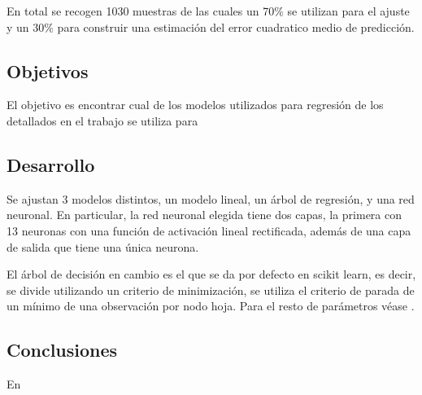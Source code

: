 \noindent 

\noindent En total se recogen 1030 muestras de las cuales un 70\% se utilizan para el ajuste y un 30\% para construir una estimación del error cuadratico medio de predicción. 
\subsection*{Objetivos} 

\noindent El objetivo es encontrar cual de los modelos utilizados para regresión de los detallados en el trabajo se utiliza para 
\subsection*{Desarrollo}
\noindent Se ajustan 3 modelos distintos, un modelo lineal, un árbol de regresión, y una red neuronal. 
En particular, la red neuronal elegida tiene dos capas, la primera con 13 neuronas con una función de activación lineal rectificada, además de una capa de salida que tiene una única neurona. 

\noindent El árbol de decisión en cambio es el que se da por defecto en scikit learn, es decir, se divide utilizando un criterio de minimización, se utiliza el criterio de parada de un mínimo de una observación por nodo hoja. Para el resto de parámetros véase \cite{Scikit-Learn}.

\noindent 

\subsection*{Conclusiones}
\noindent En 